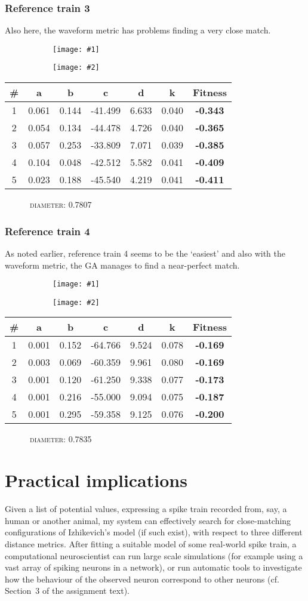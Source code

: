 \documentclass[a4paper,9pt]{article}
\newcommand{\tightit}{\vspace{-5pt}}
\newcommand{\casedata}[4]{
    \begin{figure}[!h]
        \centering
        \begin{subfigure}{.5\textwidth}
          \centering
          \texttt{[image: \#1]}
        \end{subfigure}%
        \begin{subfigure}{.5\textwidth}
          \centering
          \texttt{[image: \#2]}
        \end{subfigure}
    \end{figure}

    { \scriptsize
    \begin{tabular}{c|c|c|c|c|c||c}
    \textbf{\#} & \textbf{a} & \textbf{b} & \textbf{c} & 
      \textbf{d} & \textbf{k} & \textbf{Fitness} \\ \hline
      #3
    \end{tabular} 
    \textsc{~~~~~~diameter:} #4
    \ \\
    }
}
\newenvironment{tightquote}
{ \vspace{-2pt} \begin{quote} }
{ \end{quote} \vspace{-2pt} }
\begin{document}
\subsubsection{Reference train 3}
\tightit
Also here, the waveform metric has problems finding a very close match.

\casedata{../data/izzy-train3.dat_waveform_3.png}
         {../data/izzy-train3.dat_waveform_3.dev.png}
         {
1 & 0.061 & 0.144 & -41.499 & 6.633 & 0.040 &\textbf{-0.343} \\ \hline
2 & 0.054 & 0.134 & -44.478 & 4.726 & 0.040 &\textbf{-0.365} \\ \hline
3 & 0.057 & 0.253 & -33.809 & 7.071 & 0.039 &\textbf{-0.385} \\ \hline
4 & 0.104 & 0.048 & -42.512 & 5.582 & 0.041 &\textbf{-0.409} \\ \hline
5 & 0.023 & 0.188 & -45.540 & 4.219 & 0.041 &\textbf{-0.411} \\ \hline
         }
         {0.7807}


\subsubsection{Reference train 4}
\tightit
As noted earlier, reference train 4 seems to be the `easiest' and also with
the waveform metric, the GA manages to find a near-perfect match. 

\casedata{../data/izzy-train4.dat_waveform_2.png}
         {../data/izzy-train4.dat_waveform_2.dev.png}
         {
1 & 0.001 & 0.152 & -64.766 & 9.524 & 0.078 &\textbf{-0.169} \\ \hline
2 & 0.003 & 0.069 & -60.359 & 9.961 & 0.080 &\textbf{-0.169} \\ \hline
3 & 0.001 & 0.120 & -61.250 & 9.338 & 0.077 &\textbf{-0.173} \\ \hline
4 & 0.001 & 0.216 & -55.000 & 9.094 & 0.075 &\textbf{-0.187} \\ \hline
5 & 0.001 & 0.295 & -59.358 & 9.125 & 0.076 &\textbf{-0.200} \\ \hline
         }
         {0.7835}


\section{Practical implications}
\tightit \label{sec:implications}
Given a list of potential values, expressing a spike train recorded from, say,
a human or another animal, my system can effectively search for close-matching
configurations of Izhikevich's model (if such exist), with respect to three
different distance metrics.
After fitting a suitable model of some real-world spike train, a computational
neuroscientist can run large scale simulations (for example using a vast array
of spiking neurons in a network), or run automatic tools to investigate how
the behaviour of the observed neuron correspond to other neurons (cf.
Section~3 of the assignment text).
\end{document}
